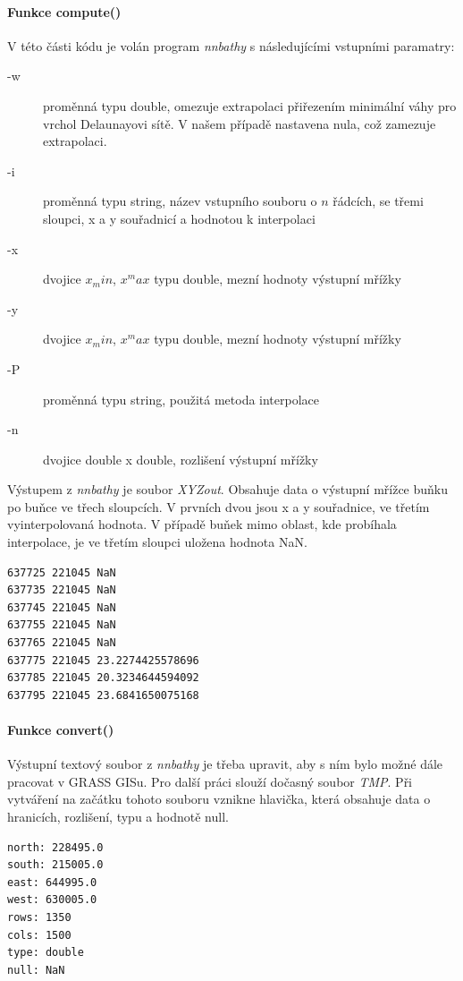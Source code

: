 \documentclass[12pt,a4paper]{article}
\begin{document}
\bigskip
\paragraph{Funkce compute()}
V této části kódu je volán program \emph{nnbathy} s následujícími vstupními paramatry:
\begin{description}
\item[-w]{proměnná typu double, omezuje extrapolaci přiřezením minimální váhy pro vrchol Delaunayovi sítě. V našem případě nastavena nula, což zamezuje extrapolaci.}
\item[-i]{proměnná typu string, název vstupního souboru o $n$ řádcích, se třemi sloupci, x a y souřadnicí a hodnotou k interpolaci}
\item[-x]{dvojice $x_min$, $x^max$ typu double, mezní hodnoty výstupní mřížky}
\item[-y]{dvojice $x_min$, $x^max$ typu double, mezní hodnoty výstupní mřížky}
\item[-P]{proměnná typu string, použitá metoda interpolace}
\item[-n]{dvojice double x double, rozlišení výstupní mřížky}
\end{description}

Výstupem z \emph{nnbathy} je soubor \emph{XYZout}. Obsahuje data o výstupní mřížce buňku po buňce ve třech sloupcích. V prvních dvou jsou x a y souřadnice, ve třetím vyinterpolovaná hodnota. V případě buňek mimo oblast, kde probíhala interpolace, je ve třetím sloupci uložena hodnota NaN.

\bigskip
\lstset{basicstyle=\footnotesize}
\begin{lstlisting}[caption={XYZout}]
637725 221045 NaN
637735 221045 NaN
637745 221045 NaN
637755 221045 NaN
637765 221045 NaN
637775 221045 23.2274425578696
637785 221045 20.3234644594092
637795 221045 23.6841650075168
\end{lstlisting}

\bigskip
\paragraph{Funkce convert()}
Výstupní textový soubor z \emph{nnbathy} je třeba upravit, aby s ním bylo možné dále pracovat v GRASS GISu. Pro další práci slouží dočasný soubor \emph{TMP}. Při vytváření na začátku tohoto souboru vznikne hlavička, která obsahuje data o hranicích, rozlišení, typu a hodnotě null.

\bigskip
\lstset{basicstyle=\ttfamily}
\begin{lstlisting}[caption={Hlavička souboru TMP}]
north: 228495.0
south: 215005.0
east: 644995.0
west: 630005.0
rows: 1350
cols: 1500
type: double
null: NaN
\end{lstlisting}
\end{document}
